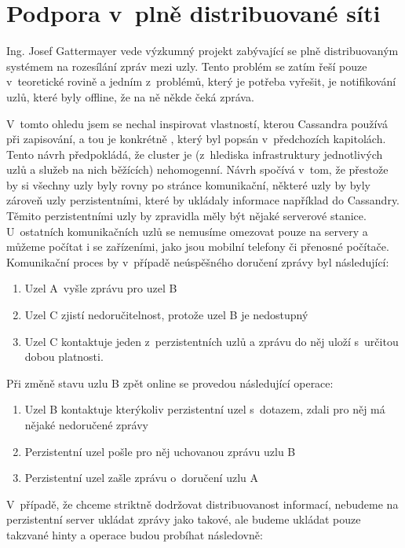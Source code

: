 \section{Podpora v~plně distribuované síti}
Ing. Josef Gattermayer vede výzkumný projekt zabývající se plně distribuovaným systémem na rozesílání zpráv mezi uzly. Tento problém se zatím řeší pouze v~teoretické rovině a jedním z~problémů, který je potřeba vyřešit, je notifikování uzlů, které byly offline, že na ně někde čeká zpráva. 

V~tomto ohledu jsem se nechal inspirovat vlastností, kterou Cassandra používá při zapisování, a tou je konkrétně , který byl popsán v~předchozích kapitolách. Tento návrh předpokládá, že cluster je (z~hlediska infrastruktury jednotlivých uzlů a služeb na nich běžících) nehomogenní. Návrh spočívá v~tom, že přestože by si všechny uzly byly rovny po stránce komunikační, některé uzly by byly zároveň uzly perzistentními, které by ukládaly informace například do Cassandry. Těmito perzistentními uzly by zpravidla měly být nějaké serverové stanice. U~ostatních komunikačních uzlů se nemusíme omezovat pouze na servery a můžeme počítat i se zařízeními, jako jsou mobilní telefony či přenosné počítače. Komunikační proces by v~případě neúspěšného doručení zprávy byl následující: 

\begin{enumerate}
\item Uzel A~vyšle zprávu pro uzel B
\item Uzel C zjistí nedoručitelnost, protože uzel B je nedostupný
\item Uzel C kontaktuje jeden z~perzistentních uzlů a zprávu do něj uloží s~určitou dobou platnosti. 
\end{enumerate}

Při změně stavu uzlu B zpět online se provedou následující operace:

\begin{enumerate}
\item Uzel B kontaktuje kterýkoliv perzistentní uzel s~dotazem, zdali pro něj má nějaké nedoručené zprávy
\item Perzistentní uzel pošle pro něj uchovanou zprávu uzlu B
\item Perzistentní uzel zašle zprávu o~doručení uzlu
A~\end{enumerate}


V~případě, že chceme striktně dodržovat distribuovanost informací, nebudeme na perzistentní server ukládat zprávy jako takové, ale budeme ukládat pouze takzvané hinty a operace budou probíhat následovně: 

